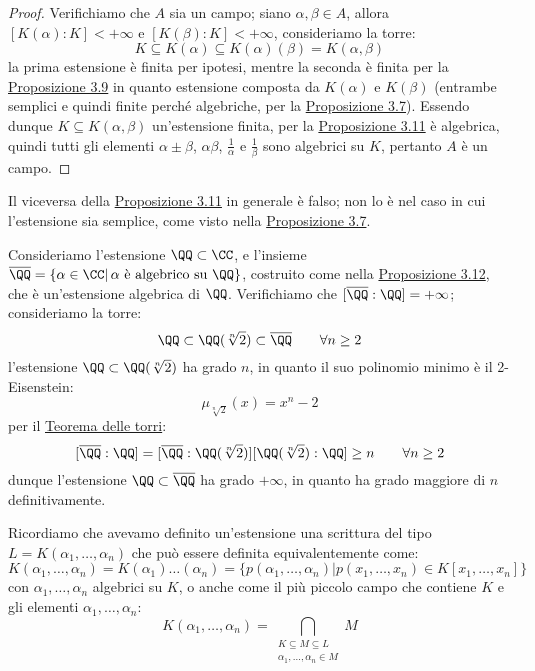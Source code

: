 \documentclass[11pt]{scrartcl}
\begin{document}
\begin{proof}
    Verifichiamo che $A$ sia un campo; siano $\alpha,\beta \in A$, allora $[K(\alpha):K] <+\infty$ e $[K(\beta):K]<+\infty$, consideriamo la torre:
    \[ K \subseteq K(\alpha) \subseteq K(\alpha)(\beta) = K(\alpha,\beta)
        \]
    la prima estensione è finita per ipotesi, mentre la seconda è finita per la \hyperref[3.9]{Proposizione 3.9} in quanto estensione composta da $K(\alpha)$ e $K(\beta)$ (entrambe semplici e quindi finite perché algebriche, per la \hyperref[3.7]{Proposizione 3.7}).
    Essendo dunque $K \subseteq K(\alpha,\beta)$ un'estensione finita, per la \hyperref[3.11]{Proposizione 3.11}
    è algebrica, quindi tutti gli elementi $\alpha\pm\beta$, $\alpha\beta$, $\displaystyle\frac{1}{\alpha}$ e $\displaystyle\frac{1}{\beta}$ sono algebrici su $K$, pertanto $A$ è un campo.
\end{proof}

\begin{remark}
    Il viceversa della \hyperref[3.11]{Proposizione 3.11} in generale è falso; non lo è nel caso in cui l'estensione sia semplice, come visto nella \hyperref[3.7]{Proposizione 3.7}.
\end{remark}

\begin{example}
    Consideriamo l'estensione $\QQ \subset \CC$, e l'insieme $\overline\QQ = \{\alpha \in \CC | \, \text{$\alpha$ è algebrico su $\QQ$}\}$, costruito come nella \hyperref[3.12]{Proposizione 3.12},
    che è un'estensione algebrica di $\QQ$. Verifichiamo che $[\overline\QQ:\QQ] = +\infty$; consideriamo la torre:
    \[ \QQ \subset \QQ(\sqrt[n]{2}) \subset \overline \QQ \qquad \forall n \geq 2
        \]
    l'estensione $\QQ \subset \QQ(\sqrt[n]{2})$ ha grado $n$, in quanto il suo polinomio minimo è il 2-Eisenstein:
    \[ \mu_{\sqrt[n]{2}}(x) = x^n - 2
        \]
    per il \hyperref[torri]{Teorema delle torri}:
    \[ [\overline \QQ: \QQ] = [\overline \QQ: \QQ(\sqrt[n]{2})] [\QQ(\sqrt[n]{2}) : \QQ] \geq n \qquad \forall n \geq 2
        \]
    dunque l'estensione $\QQ \subset \overline\QQ$ ha grado $+\infty$, in quanto ha grado maggiore di $n$ definitivamente.
\end{example}

\pagebreak

\begin{remark}
    Ricordiamo che avevamo definito un'estensione  una scrittura del tipo $L = K(\alpha_1,\ldots,\alpha_n)$ che può essere definita equivalentemente come:
    \[ K(\alpha_1,\ldots,\alpha_n) = K(\alpha_1)\ldots(\alpha_n) = \{p(\alpha_1,\ldots,\alpha_n) | p(x_1,\ldots,x_n) \in K[x_1,\ldots,x_n] \}
        \]
    con $\alpha_1,\ldots,\alpha_n$ algebrici su $K$, o anche come il più piccolo campo che contiene $K$ e gli elementi $\alpha_1,\ldots,\alpha_n$:
    \[ K(\alpha_1,\ldots,\alpha_n) = \bigcap_{\substack{K \subseteq M \subseteq L \\ \alpha_1,\ldots,\alpha_n \in M}}M
        \]
\end{remark}
\end{document}
